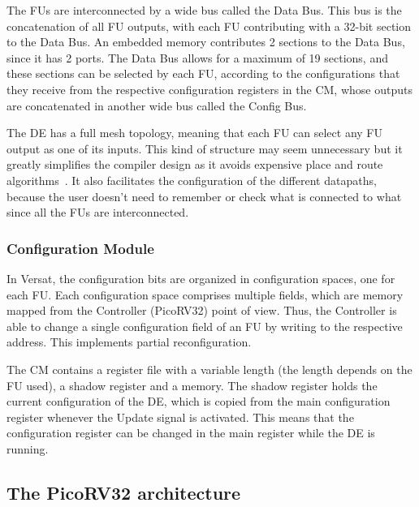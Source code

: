 \documentclass[conference]{IEEEtran}
\begin{document}
The \ac{FU}s are interconnected by a wide bus called the Data Bus. This bus is
the concatenation of all \ac{FU} outputs, with each FU contributing with a
32-bit section to the Data Bus. An embedded memory contributes 2 sections to the
Data Bus, since it has 2 ports. The Data Bus allows for a maximum of 19
sections, and these sections can be selected by each FU, according to the
configurations that they receive from the respective configuration registers in
the \ac{CM}, whose outputs are concatenated in another wide bus called the
Config Bus.

The \ac{DE} has a full mesh topology, meaning that each FU can select any
\ac{FU} output as one of its inputs. This kind of structure may seem unnecessary
but it greatly simplifies the compiler design as it avoids expensive place and
route algorithms~\cite{sousa:versat2016}. It also facilitates the configuration
of the different datapaths, because the user doesn't need to remember or check
what is connected to what since all the \ac{FU}s are interconnected.

\subsubsection{Configuration Module}
\label{subsection:configuration}

In Versat, the configuration bits are organized in configuration spaces, one for
each \ac{FU}. Each configuration space comprises multiple fields, which are memory
mapped from the Controller (PicoRV32) point of view. Thus, the Controller is able to
change a single configuration field of an FU by writing to the respective address. This
implements partial reconfiguration.

The \ac{CM} contains a register file with a variable length (the length depends on the 
\ac{FU} used), a shadow register and a memory. The shadow register holds the current
configuration of the \ac{DE}, which is copied from the main configuration register
whenever the Update signal is activated. This means that the configuration
register can be changed in the main register while the \ac{DE} is running.


\subsection{The PicoRV32 architecture}
\label{section:picorv32}
\end{document}
